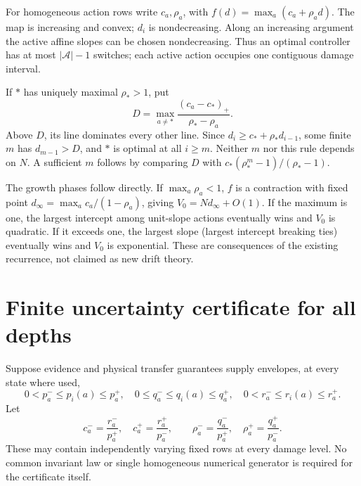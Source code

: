 \documentclass[10pt,a4paper]{article}
\begin{document}
For homogeneous action rows write $c_a,\rho_a$, with $f(d)=\max_a(c_a+\rho_a d)$. The map is increasing and convex; $d_i$ is nondecreasing. Along an increasing argument the active affine slopes can be chosen nondecreasing. Thus an optimal controller has at most $|\mathcal A|-1$ switches; each active action occupies one contiguous damage interval.

If $*$ has uniquely maximal $\rho_*>1$, put
\begin{equation}
D=\max_{a\ne *}\frac{(c_a-c_*)_+}{\rho_*-\rho_a}.
\label{eq:threshold}
\end{equation}
Above $D$, its line dominates every other line. Since
$d_i\ge c_*+\rho_*d_{i-1}$, some finite $m$ has $d_{m-1}>D$, and $*$ is optimal at all $i\ge m$. Neither $m$ nor this rule depends on $N$. A sufficient $m$ follows by comparing $D$ with $c_*(\rho_*^m-1)/(\rho_*-1)$.

The growth phases follow directly. If $\max_a\rho_a<1$, $f$ is a contraction with fixed point $d_\infty=\max_a c_a/(1-\rho_a)$, giving $V_0=Nd_\infty+O(1)$. If the maximum is one, the largest intercept among unit-slope actions eventually wins and $V_0$ is quadratic. If it exceeds one, the largest slope (largest intercept breaking ties) eventually wins and $V_0$ is exponential. These are consequences of the existing recurrence, not claimed as new drift theory.

\section{Finite uncertainty certificate for all depths}

Suppose evidence and physical transfer guarantees supply envelopes, at every state where used,
\begin{equation}
0<p_a^-\le p_i(a)\le p_a^+,\quad
0\le q_a^-\le q_i(a)\le q_a^+,\quad
0<r_a^-\le r_i(a)\le r_a^+ .
\label{eq:boxes}
\end{equation}
Let
\[
c_a^-=\frac{r_a^-}{p_a^+},\quad c_a^+=\frac{r_a^+}{p_a^-},
\qquad \rho_a^-=\frac{q_a^-}{p_a^+},\quad \rho_a^+=\frac{q_a^+}{p_a^-}.
\]
These may contain independently varying fixed rows at every damage level. No common invariant law or single homogeneous numerical generator is required for the certificate itself.
\end{document}
